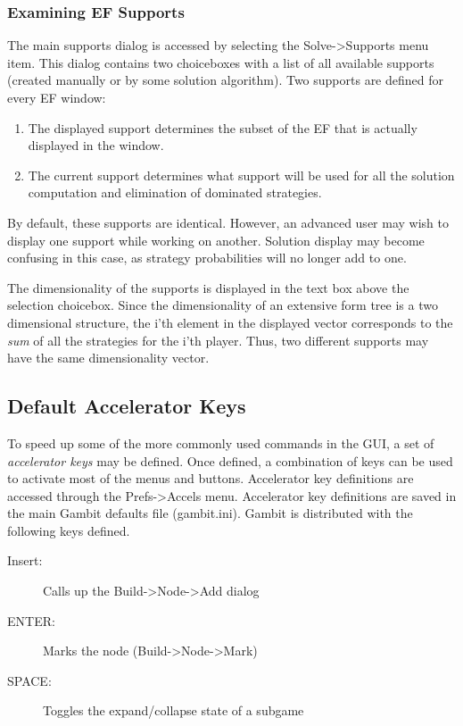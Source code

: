 \subsubsection{Examining EF Supports}\label{efsuptexam}
The main supports dialog is accessed by selecting the Solve->Supports menu item.  This dialog
contains two choiceboxes with a list of all available supports (created manually or 
by some solution algorithm).
Two supports are defined for every EF window:
\begin{enumerate}
\item The displayed support determines the subset of the EF that is actually
displayed in the window.
\item The current support determines what support will be used for all the solution
computation and elimination of dominated strategies. 
\end{enumerate}
By default, these supports are identical.  However, an advanced user may wish to
display one support while working on another.  Solution display may become 
confusing in this case, as strategy probabilities will no longer add to one.  

The dimensionality of the supports is displayed in the text box above the selection
choicebox.  Since the dimensionality of an extensive form tree is a two dimensional structure,
the i'th element in the displayed vector corresponds to the {\em sum} of all the strategies
for the i'th player.  Thus, two different supports may have the same dimensionality vector.


\subsection{Default Accelerator Keys}\label{ExtFormDefAccl}
To speed up some of the more commonly used commands in the GUI, a set of
{\em accelerator keys} may be defined.  Once defined, a combination of keys
can be used to activate most of the menus and buttons.  Accelerator key
definitions are accessed through the Prefs->Accels menu.  Accelerator key
definitions are saved in the main Gambit defaults file (gambit.ini).  Gambit
is distributed with the following keys defined.
\begin{description}
\item[Insert:] Calls up the Build->Node->Add dialog
\item[ENTER:] Marks the node (Build->Node->Mark)
\item[SPACE:] Toggles the expand/collapse state of a subgame
\end{description}

